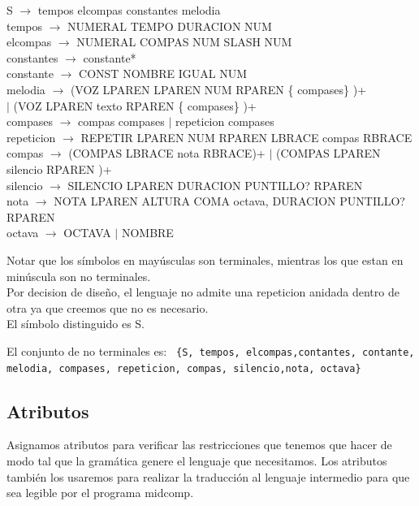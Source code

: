 \documentclass[a4paper]{article}
\begin{document}
S $\rightarrow$ tempos elcompas constantes melodia \\
tempos $\rightarrow$ NUMERAL TEMPO DURACION NUM \\
elcompas $\rightarrow$  NUMERAL COMPAS NUM SLASH NUM \\
constantes $\rightarrow$  constante* \\
constante $\rightarrow$  CONST NOMBRE IGUAL NUM \\
melodia $\rightarrow$  (VOZ LPAREN LPAREN NUM RPAREN \{ compases\} )+ \\$|$ (VOZ LPAREN texto RPAREN \{ compases\} )+ \\
compases $\rightarrow$ compas compases $|$ repeticion compases \\
repeticion $\rightarrow$ REPETIR LPAREN NUM RPAREN LBRACE compas RBRACE \\
compas $\rightarrow$ (COMPAS LBRACE nota RBRACE)+ $|$ (COMPAS LPAREN silencio RPAREN )+ \\
silencio $\rightarrow$ SILENCIO LPAREN DURACION PUNTILLO? RPAREN  \\
nota $\rightarrow$ NOTA LPAREN ALTURA COMA octava, DURACION PUNTILLO? RPAREN  \\
octava $\rightarrow$ OCTAVA $|$ NOMBRE \linebreak

Notar que los símbolos en mayúsculas son terminales, mientras los que estan en minúscula son no terminales.\\
Por decision de diseño, el lenguaje no admite una repeticion anidada dentro de otra ya que 
creemos que no es necesario.\\



El símbolo distinguido es S.\linebreak



El conjunto de no terminales es:\linebreak
\texttt{
\{S, tempos, elcompas,contantes, contante, melodia, compases, repeticion, compas, silencio,nota, octava\}  \\
}



\subsection{Atributos}

Asignamos atributos para verificar las restricciones que tenemos que hacer de modo tal que la gramática genere el lenguaje que necesitamos.
Los atributos también los usaremos para realizar la traducción al lenguaje intermedio para que sea legible por el programa midcomp. \linebreak
\end{document}
